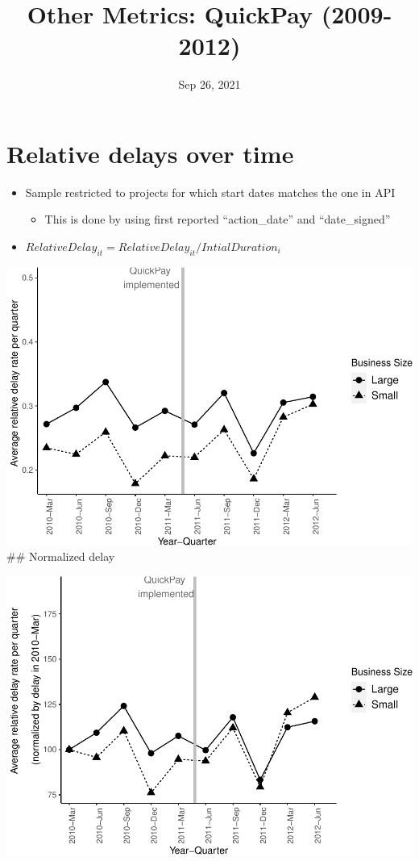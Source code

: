 \documentclass[
]{article}
\title{Other Metrics: QuickPay (2009-2012)}
\author{}
\date{\vspace{-2.5em}Sep 26, 2021}
\providecommand{\tightlist}{%
  \setlength{\itemsep}{0pt}\setlength{\parskip}{0pt}}
\begin{document}
\maketitle

\hypertarget{relative-delays-over-time}{%
\section{Relative delays over time}\label{relative-delays-over-time}}

\begin{itemize}
\tightlist
\item
  Sample restricted to projects for which start dates matches the one in
  API

  \begin{itemize}
  \tightlist
  \item
    This is done by using first reported ``action\_date'' and
    ``date\_signed''
  \end{itemize}
\item
  \(RelativeDelay_{it} = RelativeDelay_{it}/IntialDuration_i\)
\end{itemize}

\includegraphics{qp_first_relative_delay_files/figure-latex/plot_relative_delay-1.pdf}
\#\# Normalized delay

\includegraphics{qp_first_relative_delay_files/figure-latex/normalized_plot-1.pdf}
\end{document}

